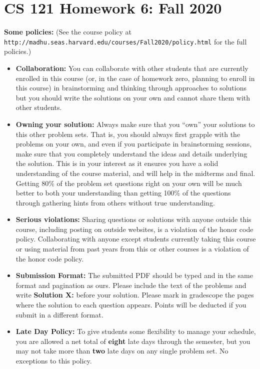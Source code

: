 \documentclass[11pt]{article}
\begin{document}
	
	\section*{CS 121 Homework 6: Fall
		2020}\label{cs-121-homework-zero-fall-2020}
	
	\textbf{Some policies:} (See the course policy at  {\tt http://madhu.seas.harvard.edu/courses/Fall2020/policy.html} for the
	full policies.)
	
	\begin{itemize}
		\item
		{\bf Collaboration:} You can collaborate with other students that are currently enrolled in
		this course (or, in the case of homework zero, planning to enroll in
		this course) in brainstorming and thinking through approaches to
		solutions but you should write the solutions on your own and cannot
		share them with other students. 
		\item
		{\bf Owning your solution:} Always make sure that you ``own'' your solutions to this other problem
		sets. That is, you should always first grapple with the problems on
		your own, and even if you participate in brainstorming sessions, make
		sure that you completely understand the ideas and details underlying
		the solution. This is in your interest as it ensures you have a solid
		understanding of the course material, and will help in the midterms
		and final. Getting 80\% of the problem
		set questions right on your own will be much better to both your
		understanding than getting 100\% of the questions through
		gathering hints from others without true understanding.
		\item
		{\bf Serious violations:} Sharing questions or solutions with anyone outside this course,
		including posting on outside websites, is a violation of the honor
		code policy. Collaborating with anyone except students currently
		taking this course or using material from past years from this or
		other courses is a violation of the honor code policy.
		\item
		{\bf Submission Format:} The submitted PDF should be typed and in the same format and
		pagination as ours. Please include the text of the problems and write
		\textbf{Solution X:} before your solution. Please mark in gradescope 
		the pages where
		the solution to each question appears. Points will be deducted if you
		submit in a different format.
		\item {\bf Late Day Policy:} To give students some flexibility to manage your schedule, you are allowed a net total of {\bf eight} late days through the semester, but you may not take more than {\bf two} late days on any single problem set. No exceptions to this policy. 
	\end{itemize}
	
\end{document}

